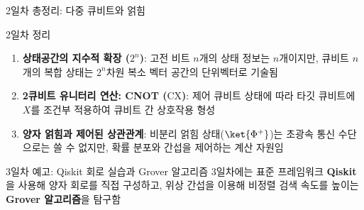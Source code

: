 \documentclass[aspectratio=169, 10pt]{beamer}
\begin{document}
\begin{frame}{2일차 총정리: 다중 큐비트와 얽힘}
    \begin{qcblock}{2일차 정리}
        \begin{enumerate}
            \item \textbf{상태공간의 지수적 확장 ($2^n$)}:
            고전 비트 $n$개의 상태 정보는 $n$개이지만, 큐비트 $n$개의 복합 상태는 $2^n$차원 복소 벡터 공간의 단위벡터로 기술됨
            \item \textbf{2큐비트 유니터리 연산: CNOT ($\mathrm{CX}$)}:
            제어 큐비트 상태에 따라 타깃 큐비트에 $X$를 조건부 적용하여 큐비트 간 상호작용 형성
            \item \textbf{양자 얽힘과 제어된 상관관계}:
            비분리 얽힘 상태($\ket{\Phi^+}$)는 초광속 통신 수단으로는 쓸 수 없지만, 확률 분포와 간섭을 제어하는 계산 자원임
        \end{enumerate}
    \end{qcblock}
    \pause
    \vspace{0.2cm}
    \begin{qctip}{3일차 예고: Qiskit 회로 실습과 Grover 알고리즘}
        3일차에는 표준 프레임워크 \textbf{Qiskit}을 사용해 양자 회로를 직접 구성하고,
        위상 간섭을 이용해 비정렬 검색 속도를 높이는 \textbf{Grover 알고리즘}을 탐구함
    \end{qctip}
\end{frame}
\end{document}

